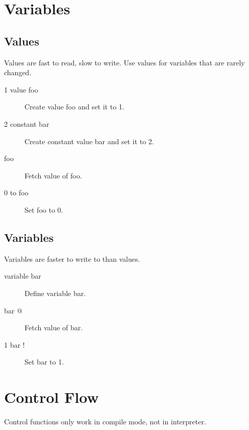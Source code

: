 \section{Variables}

\subsection{Values}

Values are fast to read, slow to write. Use values for variables
that are rarely changed.

\begin{description}
\item[1 value foo] Create value foo and set it to 1.
\item[2 constant bar] Create constant value bar and set it to 2.
\item[foo] Fetch value of foo.
\item[0 to foo] Set foo to 0.
\end{description}

\subsection{Variables}

Variables are faster to write to than values.

\begin{description}
\item[variable bar] Define variable bar.
\item[bar @] Fetch value of bar.
\item[1 bar !] Set bar to 1.
\end{description}

\section{Control Flow}

Control functions only work in compile mode, not in interpreter.

